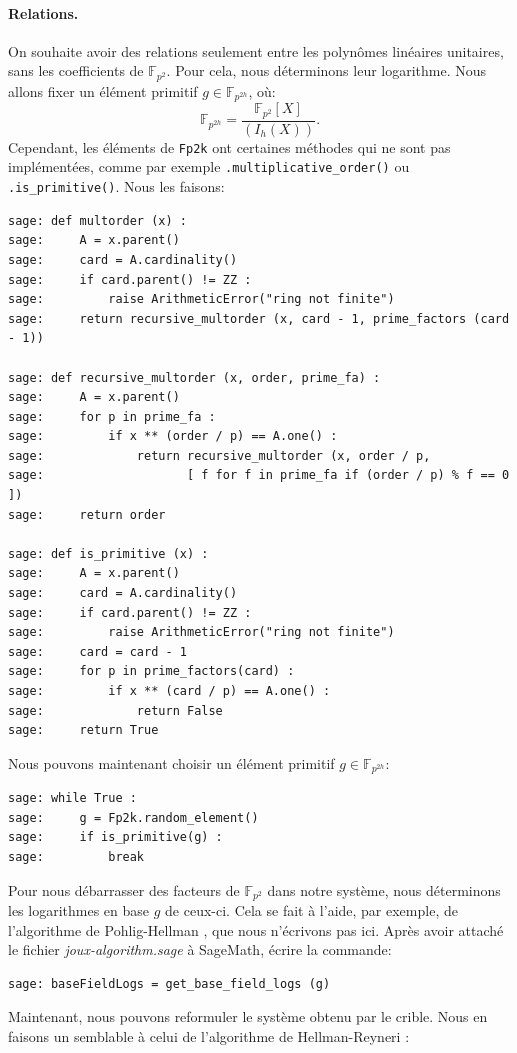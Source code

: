\documentclass[a4paper, titlepage, 11pt]{article}
\theoremstyle{definition}
\theoremstyle{remark}
\def\gf #1{\mathbb{F}_{#1}}
\begin{document}
\paragraph{Relations.}On souhaite avoir des relations seulement entre les polynômes linéaires unitaires, sans les coefficients de $\gf{p^2}$. Pour cela, nous déterminons leur logarithme. Nous allons fixer un élément primitif $g \in \gf{p^{2h}}$, où: $$\gf{p^{2h}} = \frac{\gf{p^2}[X]}{(I_h(X))}.$$
Cependant, les éléments de \verb|Fp2k| ont certaines méthodes qui ne sont pas implémentées, comme par exemple \verb|.multiplicative_order()| ou \verb|.is_primitive()|. Nous les faisons:
\begin{verbatim}
sage: def multorder (x) :
sage:     A = x.parent()
sage:     card = A.cardinality()
sage:     if card.parent() != ZZ :
sage:         raise ArithmeticError("ring not finite")
sage:     return recursive_multorder (x, card - 1, prime_factors (card - 1))

sage: def recursive_multorder (x, order, prime_fa) :
sage:     A = x.parent()
sage:     for p in prime_fa :
sage:         if x ** (order / p) == A.one() :
sage:             return recursive_multorder (x, order / p, 
sage:                    [ f for f in prime_fa if (order / p) % f == 0 ])
sage:     return order

sage: def is_primitive (x) :
sage:     A = x.parent()
sage:     card = A.cardinality()
sage:     if card.parent() != ZZ :
sage:         raise ArithmeticError("ring not finite")
sage:     card = card - 1
sage:     for p in prime_factors(card) :
sage:         if x ** (card / p) == A.one() :
sage:             return False
sage:     return True
\end{verbatim}
Nous pouvons maintenant choisir un élément primitif $g \in \gf{p^{2h}}$:
\begin{verbatim}
sage: while True :
sage:     g = Fp2k.random_element()
sage:     if is_primitive(g) :
sage:         break
\end{verbatim}
Pour nous débarrasser des facteurs de $\gf{p^2}$ dans notre système, nous déterminons les logarithmes en base $g$ de ceux-ci. Cela se fait à l'aide, par exemple, de l'algorithme de Pohlig-Hellman \cite{pohligHellman1978}, que nous n'écrivons pas ici. Après avoir attaché le fichier \textit{joux-algorithm.sage} à SageMath, écrire la commande:
\begin{verbatim}
sage: baseFieldLogs = get_base_field_logs (g)
\end{verbatim}
Maintenant, nous pouvons reformuler le système obtenu par le crible. Nous en faisons un semblable à celui de l'algorithme de Hellman-Reyneri \cite{hellman1982}:
\end{document}
